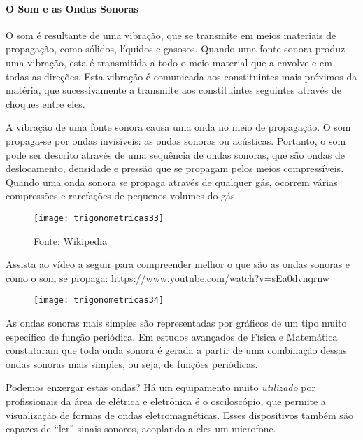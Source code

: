 \begin{knowledge}
\label{trig-knowledge1}
\vspace{-2\parskip}
\paragraph{O Som e as Ondas Sonoras}
O som é resultante de uma vibração, que se transmite em meios materiais de propagação, como sólidos, líquidos e gasosos.  Quando uma fonte sonora produz uma vibração, esta é transmitida a todo o meio material que a envolve e em todas as direções. Esta vibração é comunicada aos constituintes mais próximos da matéria, que sucessivamente a transmite aos constituintes seguintes através de choques entre eles.

A vibração de uma fonte sonora causa uma onda no meio de propagação. O som propaga-se por ondas invisíveis: as ondas sonoras ou acústicas. Portanto, o som pode ser descrito através de uma sequência de ondas sonoras, que são ondas de deslocamento, densidade e pressão que se propagam pelos meios compressíveis. Quando uma onda sonora se propaga através de qualquer gás, ocorrem várias compressões e rarefações de pequenos volumes do gás.

\begin{figure}[H]
\centering

\texttt{[image: trigonometricas33]}
\caption{Fonte: \href{https://pt.wikipedia.org/wiki/Som}{Wikipedia} }

\end{figure}

Assista ao vídeo a seguir para compreender melhor o que são as ondas sonoras e como o som se propaga: \url{https://www.youtube.com/watch?v=sEa0dvnqrnw}

\begin{figure}[H]
\centering

\texttt{[image: trigonometricas34]}
\end{figure}

\needspace{5em}
As ondas sonoras mais simples são representadas por gráficos de um tipo muito específico de função periódica. Em estudos avançados de Física e Matemática constataram que toda onda sonora é gerada a partir de uma combinação dessas ondas sonoras mais simples, ou seja, de funções periódicas.

Podemos enxergar estas ondas? Há um equipamento muito \textit{utilizado} por profissionais da área de elétrica e eletrônica é o osciloscópio, que permite a visualização de formas de ondas eletromagnéticas. Esses dispositivos também são capazes de “ler”{} sinais sonoros, acoplando a eles um microfone.


\end{knowledge}
